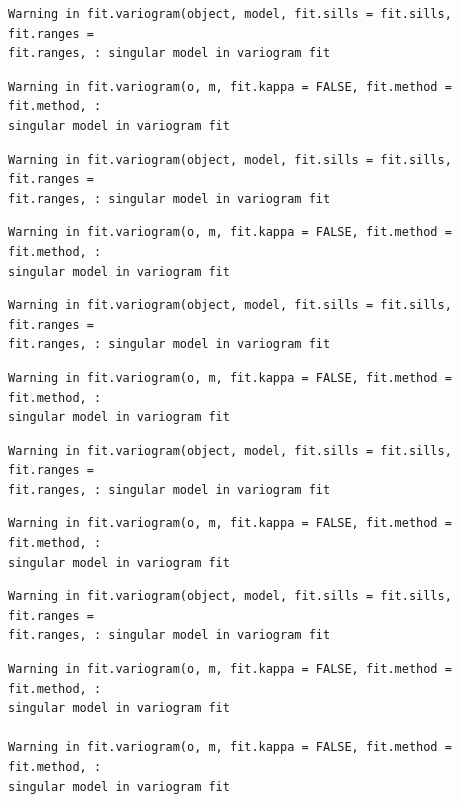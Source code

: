 \documentclass[
  letterpaper,
  DIV=11,
  numbers=noendperiod]{scrartcl}
\begin{document}
\begin{verbatim}
Warning in fit.variogram(object, model, fit.sills = fit.sills, fit.ranges =
fit.ranges, : singular model in variogram fit
\end{verbatim}

\begin{verbatim}
Warning in fit.variogram(o, m, fit.kappa = FALSE, fit.method = fit.method, :
singular model in variogram fit
\end{verbatim}

\begin{verbatim}
Warning in fit.variogram(object, model, fit.sills = fit.sills, fit.ranges =
fit.ranges, : singular model in variogram fit
\end{verbatim}

\begin{verbatim}
Warning in fit.variogram(o, m, fit.kappa = FALSE, fit.method = fit.method, :
singular model in variogram fit
\end{verbatim}

\begin{verbatim}
Warning in fit.variogram(object, model, fit.sills = fit.sills, fit.ranges =
fit.ranges, : singular model in variogram fit
\end{verbatim}

\begin{verbatim}
Warning in fit.variogram(o, m, fit.kappa = FALSE, fit.method = fit.method, :
singular model in variogram fit
\end{verbatim}

\begin{verbatim}
Warning in fit.variogram(object, model, fit.sills = fit.sills, fit.ranges =
fit.ranges, : singular model in variogram fit
\end{verbatim}

\begin{verbatim}
Warning in fit.variogram(o, m, fit.kappa = FALSE, fit.method = fit.method, :
singular model in variogram fit
\end{verbatim}

\begin{verbatim}
Warning in fit.variogram(object, model, fit.sills = fit.sills, fit.ranges =
fit.ranges, : singular model in variogram fit
\end{verbatim}

\begin{verbatim}
Warning in fit.variogram(o, m, fit.kappa = FALSE, fit.method = fit.method, :
singular model in variogram fit

Warning in fit.variogram(o, m, fit.kappa = FALSE, fit.method = fit.method, :
singular model in variogram fit
\end{verbatim}
\end{document}
